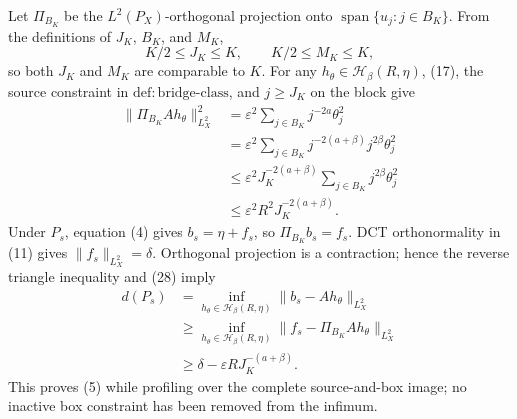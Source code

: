 Let \(\Pi_{B_K}\) be the \(L^2(P_X)\)-orthogonal projection onto \(\operatorname{span}\{u_j:j\in B_K\}\).  From the definitions of \(J_K\), \(B_K\), and \(M_K\),
\[
K/2\le J_K\le K,
\qquad
K/2\le M_K\le K,
\tag{27}
\]
so both \(J_K\) and \(M_K\) are comparable to \(K\).  For any \(h_\theta\in\mathcal H_\beta(R,\eta)\), (17), the source constraint in \(\mathrm{def:bridge\mbox{-}class}\), and \(j\ge J_K\) on the block give
\[
\begin{aligned}
\|\Pi_{B_K}Ah_\theta\|_{L^2_X}^2
&=\varepsilon^2\sum_{j\in B_K}j^{-2a}\theta_j^2 \\
&=\varepsilon^2\sum_{j\in B_K}j^{-2(a+\beta)}j^{2\beta}\theta_j^2 \\
&\le\varepsilon^2J_K^{-2(a+\beta)}
       \sum_{j\in B_K}j^{2\beta}\theta_j^2 \\
&\le\varepsilon^2R^2J_K^{-2(a+\beta)}.
\end{aligned}
\tag{28}
\]
Under \(P_s\), equation (4) gives \(b_s=\eta+f_s\), so \(\Pi_{B_K}b_s=f_s\).  DCT orthonormality in (11) gives \(\|f_s\|_{L^2_X}=\delta\).  Orthogonal projection is a contraction; hence the reverse triangle inequality and (28) imply
\[
\begin{aligned}
d(P_s)
&=\inf_{h_\theta\in\mathcal H_\beta(R,\eta)}
  \|b_s-Ah_\theta\|_{L^2_X} \\
&\ge\inf_{h_\theta\in\mathcal H_\beta(R,\eta)}
  \|f_s-\Pi_{B_K}Ah_\theta\|_{L^2_X} \\
&\ge\delta-\varepsilon R J_K^{-(a+\beta)}.
\end{aligned}
\tag{29}
\]
This proves (5) while profiling over the complete source-and-box image; no inactive box constraint has been removed from the infimum.

